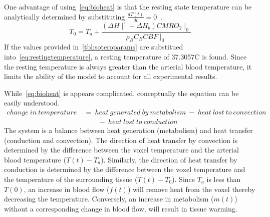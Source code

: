     One advantage of using~\cref{eq:bioheat} is that the resting state temperature can be analytically determined by substituting $\frac{dT(t)}{dt} = 0$~\citep{sotero2011}.
    \begin{equation}
      \label{eq:restingtemperature}
      T_{0} = T_{a} + \frac{(\Delta H \mid^{\circ} - \Delta H_{b}) CMRO_{2}\mid_{0}}{\rho_{B} C_{B} CBF\mid_{0}}
    \end{equation}
    If the values provided in~\cref{tbl:soteroparams} are substitued into~\cref{eq:restingtemperature}, a resting temperature of 37.3057\degree C is found.  Since the resting temperature is always greater than the arterial blood temperature, it limits the ability of the model to account for all experimental results. 
    
    While~\cref{eq:bioheat} is appears complicated, conceptually the equation can be easily understood.
    \begin{align}    
      \label{eq:soteroexplaiend}
      change\ in\ temperature\ &=\ heat\ generated\ by\ metabolism\ -\ heat\ lost\ to\ convection\ \nonumber \\
      &\qquad {} -\ heat\ lost\ to\ conduction
    \end{align}
    The system is a balance between heat generation (metabolism) and heat transfer (conduction and convection).  The direction of heat transfer by convection is determined by the difference between the voxel temperature and the arterial blood temperature ($T(t) - T_a$).  Similarly, the direction of heat transfer by conduction is determined by the difference between the voxel temperature and the temperature of the surrounding tissue ($T(t) - T_0$).  Since $T_a$ is less than $T(0)$, an increase in blood flow ($f(t)$) will remove heat from the voxel thereby decreasing the temperature.  Conversely, an increase in metabolism ($m(t)$) without a corresponding change in blood flow, will result in tissue warming.  
    
